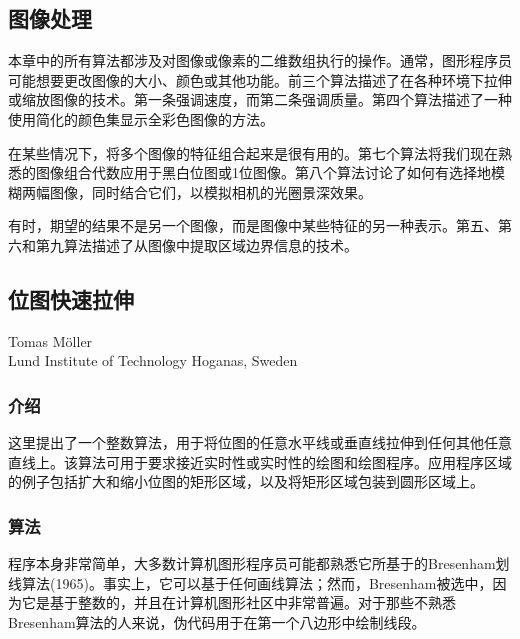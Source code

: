 \begin{CJK}{UTF8}{gkai}
\chapter{图像处理}
\end{CJK}


\begin{CJK}{UTF8}{gbsn}




本章中的所有算法都涉及对图像或像素的二维数组执行的操作。通常，图形程序员可能想要更改图像的大小、颜色或其他功能。前三个算法描述了在各种环境下拉伸或缩放图像的技术。第一条强调速度，而第二条强调质量。第四个算法描述了一种使用简化的颜色集显示全彩色图像的方法。


在某些情况下，将多个图像的特征组合起来是很有用的。第七个算法将我们现在熟悉的图像组合代数应用于黑白位图或1位图像。第八个算法讨论了如何有选择地模糊两幅图像，同时结合它们，以模拟相机的光圈景深效果。


有时，期望的结果不是另一个图像，而是图像中某些特征的另一种表示。第五、第六和第九算法描述了从图像中提取区域边界信息的技术。


\newpage
\section{位图快速拉伸}
\begin{center}
\small{
Tomas M\"oller\\
Lund Institute of Technology 
Hoganas, Sweden}
\end{center}

\subsection*{介绍}

这里提出了一个整数算法，用于将位图的任意水平线或垂直线拉伸到任何其他任意直线上。该算法可用于要求接近实时性或实时性的绘图和绘图程序。应用程序区域的例子包括扩大和缩小位图的矩形区域，以及将矩形区域包装到圆形区域上。
\subsection*{算法}
程序本身非常简单，大多数计算机图形程序员可能都熟悉它所基于的Bresenham划线算法(1965)。事实上，它可以基于任何画线算法；然而，Bresenham被选中，因为它是基于整数的，并且在计算机图形社区中非常普遍。对于那些不熟悉Bresenham算法的人来说，伪代码用于在第一个八边形中绘制线段。

\IncMargin{1em}
\begin{algorithm} 


\end{algorithm}
\end{CJK}
